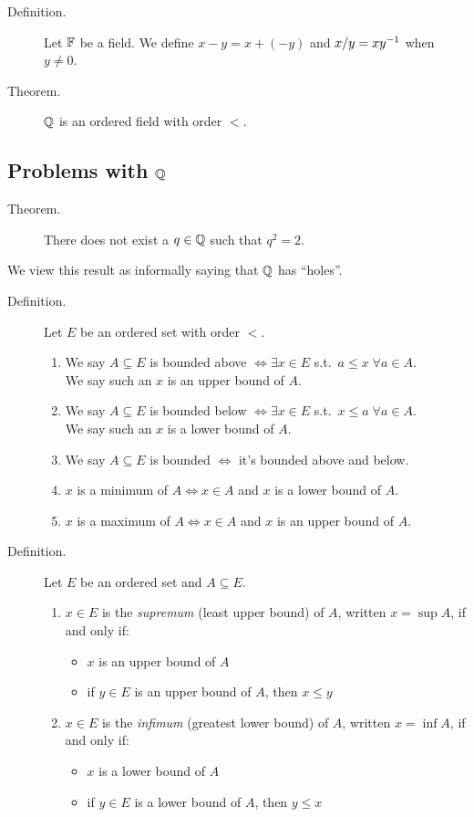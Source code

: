 \documentclass[letterpaper,11pt]{article}
\begin{document}
\begin{description}
\item[Definition.] Let $\mathbb{F}$ be a field. We define $x-y=x+(-y)$
    and $x/y=x{y^{-1}}$ when $y\ne0$.
\item[Theorem.] $\mathbb{Q}$ is an ordered field with order $<$.
\end{description}

\subsection{Problems with $\mathbb{Q}$}
\begin{description}
\item[Theorem.] There does not exist a $q\in\mathbb{Q}$ such that $q^2 = 2$.
\end{description}
We view this result as informally saying that $\mathbb{Q}$ has ``holes''.
\begin{description}
\item[Definition.] Let $E$ be an ordered set with order $<$.
  \begin{enumerate}[1)]
  \item We say $A\subseteq E$ is bounded above $\iff \exists x\in E$
      s.t.\ $a\le x\;\forall a\in A$.\\
      We say such an $x$ is an upper bound of $A$.
  \item We say $A\subseteq E$ is bounded below $\iff\exists x\in E$
      s.t.\ $x\le a\;\forall a\in A$.\\
      We say such an $x$ is a lower bound of $A$.
  \item We say $A\subseteq E$ is bounded $\iff$ it's bounded above and below.
  \item $x$ is a minimum of $A \iff x\in A$ and $x$ is a lower bound of $A$.
  \item $x$ is a maximum of $A\iff x\in A$ and $x$ is an upper bound of $A$.
  \end{enumerate}


\item[Definition.] Let $E$ be an ordered set and $A\subseteq E$.
  \begin{enumerate}[(1)]
  \item $x\in E$ is the \textit{supremum} (least upper bound)
      of $A$, written $x=\sup A$, if and only if:
      \begin{itemize}
      \item $x$ is an upper bound of $A$
      \item if $y\in E$ is an upper bound of $A$, then $x\le y$
      \end{itemize}
  \item $x\in E$ is the \textit{infimum} (greatest lower bound)
      of $A$, written $x=\inf A$, if and only if:
      \begin{itemize}
      \item $x$ is a lower bound of $A$
      \item if $y\in E$ is a lower bound of $A$, then $y\le x$
      \end{itemize}
  \end{enumerate}



\end{description}
\end{document}
